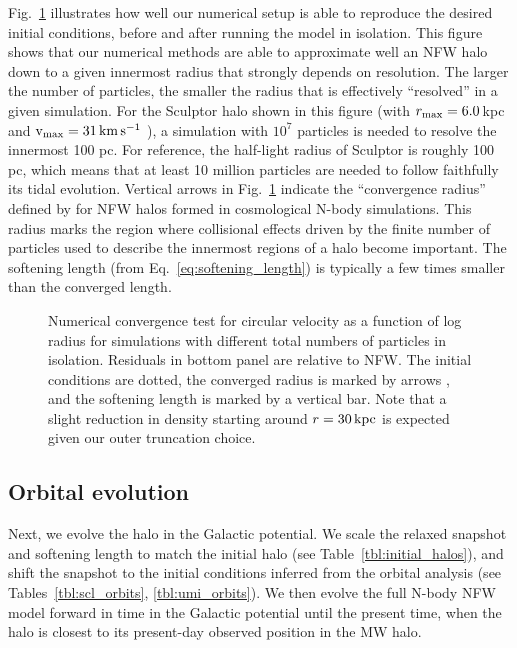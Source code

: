 Fig.~\ref{fig:numerical_convergence} illustrates how well our numerical
setup is able to reproduce the desired initial conditions, before and
after running the model in isolation. This figure shows that our
numerical methods are able to approximate well an NFW halo down to a
given innermost radius that strongly depends on resolution. The larger
the number of particles, the smaller the radius that is effectively
``resolved'' in a given simulation. For the Sculptor halo shown in this
figure (with \(r_{\rm max} = 6.0\,\)kpc and \({\rm v}_{\rm max} = 31\,{\rm km\,s^{-1}}\) ), a
simulation with \(10^7\) particles is needed to resolve the innermost
100 pc. For reference, the half-light radius of Sculptor is roughly 100
pc, which means that at least 10 million particles are needed to follow
faithfully its tidal evolution. Vertical arrows in
Fig.~\ref{fig:numerical_convergence} indicate the ``convergence radius''
defined by \citet[eq.\textasciitilde13]{power+2003} for NFW halos formed
in cosmological N-body simulations. This radius marks the region where
collisional effects driven by the finite number of particles used to
describe the innermost regions of a halo become important. The softening
length (from Eq.~\ref{eq:softening_length}) is typically a few times
smaller than the converged length.

\begin{figure}
\centering
{}
\caption[Numerical halo convergence]{Numerical convergence test for
circular velocity as a function of log radius for simulations with
different total numbers of particles in isolation. Residuals in bottom
panel are relative to NFW. The initial conditions are dotted, the
converged radius is marked by arrows \citep[from][ eq. 13]{power+2003},
and the softening length is marked by a vertical bar. Note that a slight
reduction in density starting around \(r = 30\,{\rm kpc}\) is expected given
our outer truncation choice.}\label{fig:numerical_convergence}
\end{figure}

\subsection{Orbital evolution}\label{orbital-evolution}

Next, we evolve the halo in the Galactic potential. We scale the relaxed
snapshot and softening length to match the initial halo (see
Table~\ref{tbl:initial_halos}), and shift the snapshot to the initial
conditions inferred from the orbital analysis (see
Tables~\ref{tbl:scl_orbits}, \ref{tbl:umi_orbits}). We then evolve the
full N-body NFW model forward in time in the Galactic potential until
the present time, when the halo is closest to its present-day observed
position in the MW halo.

